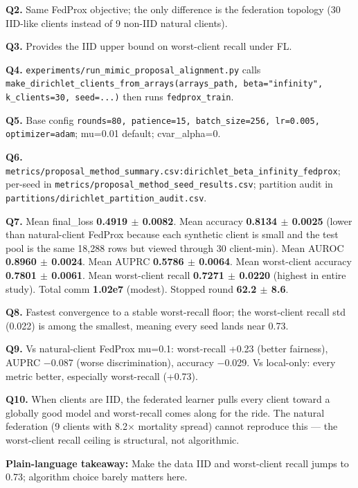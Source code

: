 \documentclass{article}
\begin{document}
\textbf{Q2.} Same FedProx objective; the only difference is the federation topology (30 IID-like clients instead of 9 non-IID natural clients).


\textbf{Q3.} Provides the IID upper bound on worst-client recall under FL.


\textbf{Q4.} \texttt{experiments/run\_mimic\_proposal\_alignment.py} calls \texttt{make\_dirichlet\_clients\_from\_arrays(arrays\_path, beta="infinity", k\_clients=30, seed=...)} then runs \texttt{fedprox\_train}.


\textbf{Q5.} Base config \texttt{rounds=80, patience=15, batch\_size=256, lr=0.005, optimizer=adam}; mu=0.01 default; cvar\_alpha=0.


\textbf{Q6.} \texttt{metrics/proposal\_method\_summary.csv:dirichlet\_beta\_infinity\_fedprox}; per-seed in \texttt{metrics/proposal\_method\_seed\_results.csv}; partition audit in \texttt{partitions/dirichlet\_partition\_audit.csv}.


\textbf{Q7.} Mean final\_loss \textbf{0.4919 \ensuremath{\pm} 0.0082}. Mean accuracy \textbf{0.8134 \ensuremath{\pm} 0.0025} (lower than natural-client FedProx because each synthetic client is small and the test pool is the same 18,288 rows but viewed through 30 client-min). Mean AUROC \textbf{0.8960 \ensuremath{\pm} 0.0024}. Mean AUPRC \textbf{0.5786 \ensuremath{\pm} 0.0064}. Mean worst-client accuracy \textbf{0.7801 \ensuremath{\pm} 0.0061}. Mean worst-client recall \textbf{0.7271 \ensuremath{\pm} 0.0220} (highest in entire study). Total comm \textbf{1.02e7} (modest). Stopped round \textbf{62.2 \ensuremath{\pm} 8.6}.


\textbf{Q8.} Fastest convergence to a stable worst-recall floor; the worst-client recall std (0.022) is among the smallest, meaning every seed lands near 0.73.


\textbf{Q9.} Vs natural-client FedProx mu=0.1: worst-recall +0.23 (better fairness), AUPRC \ensuremath{-}0.087 (worse discrimination), accuracy \ensuremath{-}0.029. Vs local-only: every metric better, especially worst-recall (+0.73).


\textbf{Q10.} When clients are IID, the federated learner pulls every client toward a globally good model and worst-recall comes along for the ride. The natural federation (9 clients with 8.2\ensuremath{\times} mortality spread) cannot reproduce this --- the worst-client recall ceiling is structural, not algorithmic.


\textbf{Plain-language takeaway:} Make the data IID and worst-client recall jumps to 0.73; algorithm choice barely matters here.
\end{document}

